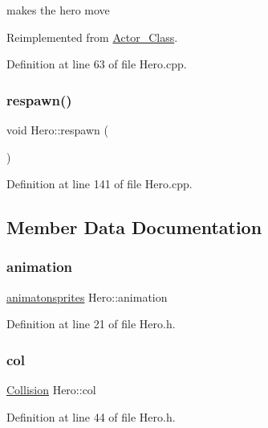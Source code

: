makes the hero move 



Reimplemented from \hyperlink{class_actor___class_af1764a94c5410ba8476f56553cd2c327}{Actor\+\_\+\+Class}.



Definition at line 63 of file Hero.\+cpp.

\hypertarget{class_hero_a585f9c068f73d937d6a6f90c9ccad41c}{}\label{class_hero_a585f9c068f73d937d6a6f90c9ccad41c} 
\subsubsection{\texorpdfstring{respawn()}{respawn()}}
{\footnotesize\ttfamily void Hero\+::respawn (\begin{DoxyParamCaption}{ }\end{DoxyParamCaption})}



Definition at line 141 of file Hero.\+cpp.



\subsection{Member Data Documentation}
\hypertarget{class_hero_a9c368b8a26455c128c1311063cdc03c1}{}\label{class_hero_a9c368b8a26455c128c1311063cdc03c1} 
\subsubsection{\texorpdfstring{animation}{animation}}
{\footnotesize\ttfamily \hyperlink{classanimatonsprites}{animatonsprites} Hero\+::animation}



Definition at line 21 of file Hero.\+h.

\hypertarget{class_hero_aea83769f887a67e6d88679a45952a61a}{}\label{class_hero_aea83769f887a67e6d88679a45952a61a} 
\subsubsection{\texorpdfstring{col}{col}}
{\footnotesize\ttfamily \hyperlink{class_collision}{Collision} Hero\+::col}



Definition at line 44 of file Hero.\+h.

